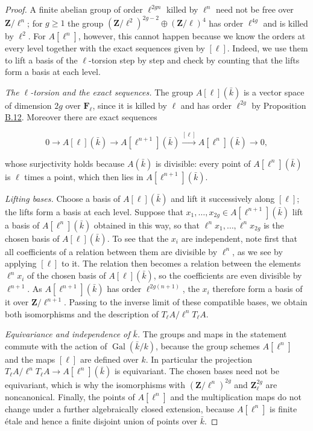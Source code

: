 \documentclass[11pt]{article}
\providecommand{\Fell}{}\renewcommand{\Fell}{\mathbf F_\ell}
\begin{document}
\begin{proof}[{Proof}]\label{bp41}%
A finite abelian group of order \(\ell^{2gn}\) killed by \(\ell^n\) need not be free over \(\mathbf Z/\ell^n\); for \(g\geq1\) the group \((\mathbf Z/\ell^2)^{2g-2}\oplus(\mathbf Z/\ell)^{4}\) has order \(\ell^{4g}\) and is killed by \(\ell^2\). For \(A[\ell^n]\), however, this cannot happen because we know the orders at every level together with the exact sequences given by \([\ell]\). Indeed, we use them to lift a basis of the \(\ell\)-torsion step by step and check by counting that the lifts form a basis at each level.

\emph{The \(\ell\)-torsion and the exact sequences.} The group \(A[\ell](\bar k)\) is a vector space of dimension \(2g\) over \(\Fell\), since it is killed by \(\ell\) and has order \(\ell^{2g}\) by Proposition \hyperref[bp34]{B.12}. Moreover there are exact sequences

\[
0\longrightarrow A[\ell](\bar k)
\longrightarrow A[\ell^{n+1}](\bar k)
\xrightarrow{[\ell]}A[\ell^n](\bar k)\longrightarrow0,
\]

whose surjectivity holds because \(A(\bar k)\) is divisible: every point of \(A[\ell^n](\bar k)\) is \(\ell\) times a point, which then lies in \(A[\ell^{n+1}](\bar k)\).

\emph{Lifting bases.} Choose a basis of \(A[\ell](\bar k)\) and lift it successively along \([\ell]\); the lifts form a basis at each level. Suppose that \(x_1,\ldots,x_{2g}\in A[\ell^{n+1}](\bar k)\) lift a basis of \(A[\ell^n](\bar k)\) obtained in this way, so that \(\ell^nx_1,\ldots,\ell^nx_{2g}\) is the chosen basis of \(A[\ell](\bar k)\). To see that the \(x_i\) are independent, note first that all coefficients of a relation between them are divisible by \(\ell^n\), as we see by applying \([\ell]\) to it. The relation then becomes a relation between the elements \(\ell^nx_i\) of the chosen basis of \(A[\ell](\bar k)\), so the coefficients are even divisible by \(\ell^{n+1}\). As \(A[\ell^{n+1}](\bar k)\) has order \(\ell^{2g(n+1)}\), the \(x_i\) therefore form a basis of it over \(\mathbf Z/\ell^{n+1}\). Passing to the inverse limit of these compatible bases, we obtain both isomorphisms and the description of \(T_\ell A/\ell^nT_\ell A\).

\emph{Equivariance and independence of \(\bar k\).} The groups and maps in the statement commute with the action of \(\operatorname{Gal}(\bar k/k)\), because the group schemes \(A[\ell^n]\) and the maps \([\ell]\) are defined over \(k\). In particular the projection \(T_\ell A/\ell^nT_\ell A\to A[\ell^n](\bar k)\) is equivariant. The chosen bases need not be equivariant, which is why the isomorphisms with \((\mathbf Z/\ell^n)^{2g}\) and \(\mathbf Z_\ell^{2g}\) are noncanonical. Finally, the points of \(A[\ell^n]\) and the multiplication maps do not change under a further algebraically closed extension, because \(A[\ell^n]\) is finite étale and hence a finite disjoint union of points over \(\bar k\).
\end{proof}
\end{document}
